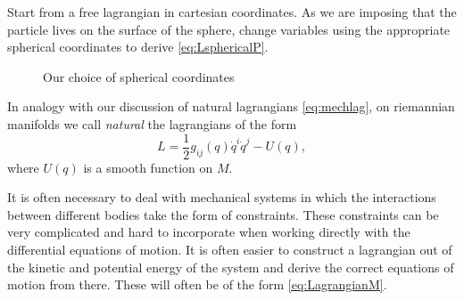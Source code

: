 \documentclass[english,fontsize=11pt,paper=a5,oneside]{scrbook}
\theoremstyle{definition}
\newenvironment{remark}
  {\pushQED{\qed}\renewcommand{\qedsymbol}{$\lozenge$}\remarkx}
  {\popQED\endremarkx}
\newenvironment{exercise}
  {\pushQED{\qed}\renewcommand{\qedsymbol}{$\maltese$}\exercisex}
  {\popQED\endexercisex}
\begin{document}
\begin{exercise}
  Start from a free lagrangian in cartesian coordinates.
  As we are imposing that the particle lives on the surface of the sphere, change variables using the appropriate spherical coordinates to derive \eqref{eq:LsphericalP}.
\end{exercise}

\begin{figure}[ht]
  \centering
  \caption{Our choice of spherical coordinates}
  \label{fig:sphcoords}
\end{figure}

In analogy with our discussion of natural lagrangians \eqref{eq:mechlag}, on riemannian manifolds we call \emph{natural} the lagrangians of the form
\begin{equation}\label{eq:LagrangianM}
  L = \frac 12 g_{ij}(q)\dot q^i \dot q^j - U(q),
\end{equation}
where $U(q)$ is a smooth function on $M$.

\begin{remark}
  It  is  often  necessary  to  deal  with  mechanical  systems  in  which the interactions between different bodies take the form of constraints.
  These constraints can  be  very  complicated  and  hard  to  incorporate  when  working directly  with  the differential  equations  of  motion.
  It  is  often  easier  to  construct  a  lagrangian out of the kinetic and potential energy of the system and derive the correct equations of motion from there.
  These will often be of the form \eqref{eq:LagrangianM}.
\end{remark}
\end{document}
